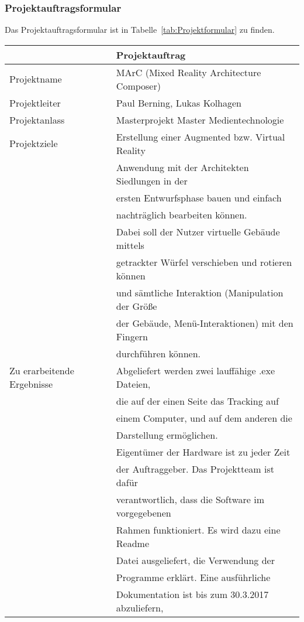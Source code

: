 \subsubsection{Projektauftragsformular}
Das Projektauftragsformular ist in Tabelle~\ref{tab:Projektformular} zu finden.
\begin{table}
	\centering
	\begin{tabularx}{\textwidth}{|l|l|}
	\hline
	\Absatzbox{}
	&\textbf{Projektauftrag}\\	
	\hline
	Projektname & MArC (Mixed Reality Architecture Composer)\\
	\hline
	Projektleiter & Paul Berning, Lukas Kolhagen\\
	\hline
	Projektanlass & Masterprojekt Master Medientechnologie\\
	\hline
	Projektziele & Erstellung einer Augmented bzw. Virtual Reality \\
	&Anwendung mit der Architekten Siedlungen in der\\ 
	& ersten Entwurfsphase bauen und einfach \\ 
	& nachträglich bearbeiten können.\\
	&Dabei soll der Nutzer virtuelle Gebäude mittels \\
	& getrackter Würfel verschieben und rotieren können \\
	&und sämtliche Interaktion (Manipulation der Größe\\ 
	& der Gebäude, Menü-Interaktionen) mit den Fingern \\
	&durchführen können.\\
	\hline
	Zu erarbeitende Ergebnisse & Abgeliefert werden zwei lauffähige .exe Dateien,\\
	& die auf der einen Seite das Tracking auf \\
	&einem Computer, und auf dem anderen die \\
	&Darstellung ermöglichen. \\
	&Eigentümer der Hardware ist zu jeder Zeit\\
	&der Auftraggeber. Das Projektteam ist dafür\\
	&verantwortlich, dass die Software im vorgegebenen\\
	&Rahmen funktioniert. Es wird dazu eine Readme \\
	&Datei ausgeliefert, die Verwendung der\\
	& Programme erklärt. Eine ausführliche \\
	&Dokumentation ist bis zum 30.3.2017 abzuliefern,\\

\end{tabularx}
\end{table}
